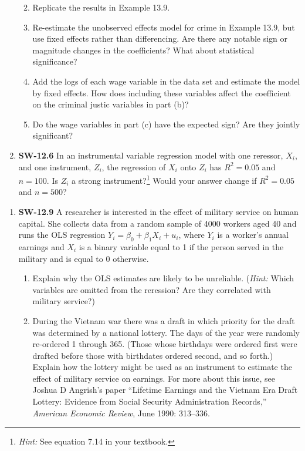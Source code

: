 \documentclass[
]{article}
\providecommand{\tightlist}{%
  \setlength{\itemsep}{0pt}\setlength{\parskip}{0pt}}
\begin{document}
\begin{enumerate}
  \begin{enumerate}
  \def\labelenumii{\alph{enumii}.}
  \item
    Replicate the results in Example 13.9.
  \item
    Re-estimate the unobserved effects model for crime in Example 13.9,
    but use fixed effects rather than differencing. Are there any
    notable sign or magnitude changes in the coefficients? What about
    statistical significance?
  \item
    Add the logs of each wage variable in the data set and estimate the
    model by fixed effects. How does including these variables affect
    the coefficient on the criminal justic variables in part (b)?
  \item
    Do the wage variables in part (c) have the expected sign? Are they
    jointly significant?
  \end{enumerate}
\item
  \textbf{SW-12.6} In an instrumental variable regression model with one
  reressor, \(X_i\), and one instrument, \(Z_i\), the regression of
  \(X_i\) onto \(Z_i\) has \(R^2 = 0.05\) and \(n = 100\). Is \(Z_i\) a
  strong instrument?\footnote{\emph{Hint:} See equation 7.14 in your
    textbook.} Would your answer change if \(R^2 = 0.05\) and
  \(n = 500\)?
\end{enumerate}

\begin{enumerate}
\def\labelenumi{\arabic{enumi}.}
\setcounter{enumi}{4}
\tightlist
\item
  \textbf{SW-12.9} A researcher is interested in the effect of military
  service on human capital. She collects data from a random sample of
  4000 workers aged 40 and runs the OLS regression
  \(Y_i = \beta_0 + \beta_1X_i + u_i\), where \(Y_i\) is a worker's
  annual earnings and \(X_i\) is a binary variable equal to 1 if the
  person served in the military and is equal to 0 otherwise.

  \begin{enumerate}
  \def\labelenumii{\alph{enumii}.}
  \tightlist
  \item
    Explain why the OLS estimates are likely to be unreliable.
    (\emph{Hint:} Which variables are omitted from the reression? Are
    they correlated with military service?)
  \item
    During the Vietnam war there was a draft in which priority for the
    draft was determined by a national lottery. The days of the year
    were randomly re-ordered 1 through 365. (Those whose birthdays were
    ordered first were drafted before those with birthdates ordered
    second, and so forth.) Explain how the lottery might be used as an
    instrument to estimate the effect of military service on earnings.
    For more about this issue, see Joshua D Angrish's paper ``Lifetime
    Earnings and the Vietnam Era Draft Lottery: Evidence from Social
    Security Administration Records,'' \emph{American Economic Review},
    June 1990: 313--336.
  \end{enumerate}
\end{enumerate}
\end{document}
